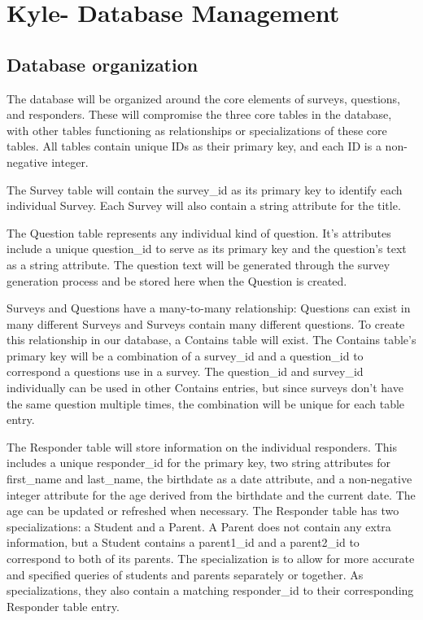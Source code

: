 \documentclass[letterpaper,10pt,serif, draftclsnofoot,onecolumn, compsoc, titlepage]{IEEEtran}
\begin{document}
\section{Kyle- Database Management}
\subsection{Database organization}
The database will be organized around the core elements of surveys, questions, and responders.
These will compromise the three core tables in the database, with other tables functioning as relationships or specializations of these core tables.
All tables contain unique IDs as their primary key, and each ID is a non-negative integer.

The Survey table will contain the survey\_id as its primary key to identify each individual Survey.
Each Survey will also contain a string attribute for the title.

The Question table represents any individual kind of question.
It's attributes include a unique question\_id to serve as its primary key and the question's text as a string attribute.
The question text will be generated through the survey generation process and be stored here when the Question is created.

Surveys and Questions have a many-to-many relationship: Questions can exist in many different Surveys and Surveys contain many different questions.
To create this relationship in our database, a Contains table will exist.
The Contains table's primary key will be a combination of a survey\_id and a question\_id to correspond a questions use in a survey.
The question\_id and survey\_id individually can be used in other Contains entries, but since surveys don't have the same question multiple times, the combination will be unique for each table entry.

The Responder table will store information on the individual responders.
This includes a unique responder\_id for the primary key, two string attributes for first\_name and last\_name, the birthdate as a date attribute, and a non-negative integer attribute for the age derived from the birthdate and the current date.
The age can be updated or refreshed when necessary.
The Responder table has two specializations: a Student and a Parent.
A Parent does not contain any extra information, but a Student contains a parent1\_id and a parent2\_id to correspond to both of its parents.
The specialization is to allow for more accurate and specified queries of students and parents separately or together.
As specializations, they also contain a matching responder\_id to their corresponding Responder table entry.
\end{document}
